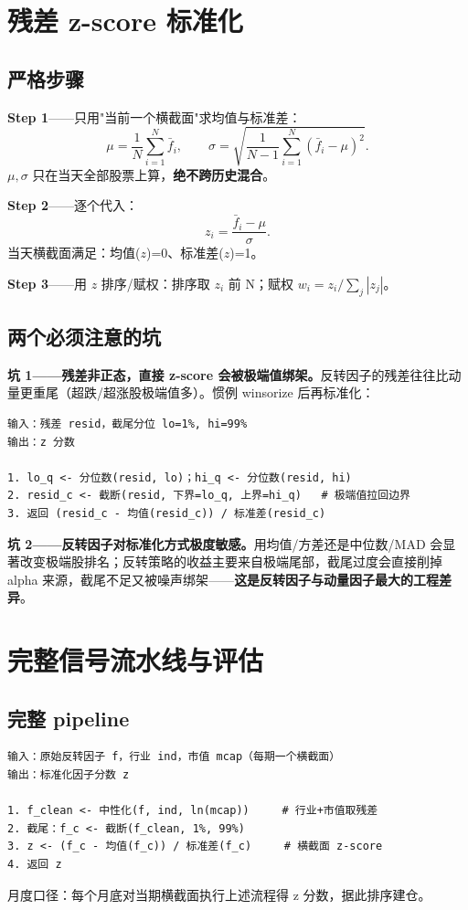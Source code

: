 \documentclass[UTF8,11pt]{ctexart}
\begin{document}
\section{残差 z-score 标准化}

\subsection{严格步骤}
\textbf{Step 1}——只用"当前一个横截面"求均值与标准差：
\begin{equation}
\mu=\frac1N\sum_{i=1}^{N}\bar f_i,\qquad
\sigma=\sqrt{\frac{1}{N-1}\sum_{i=1}^{N}(\bar f_i-\mu)^2}.
\end{equation}
$\mu,\sigma$ 只在当天全部股票上算，\textbf{绝不跨历史混合}。

\textbf{Step 2}——逐个代入：
\begin{equation}
z_i = \frac{\bar f_i-\mu}{\sigma}.
\end{equation}
当天横截面满足：均值($z$)=0、标准差($z$)=1。

\textbf{Step 3}——用 $z$ 排序/赋权：排序取 $z_i$ 前 N；赋权 $w_i=z_i/\sum_j|z_j|$。

\subsection{两个必须注意的坑}
\textbf{坑 1——残差非正态，直接 z-score 会被极端值绑架。}反转因子的残差往往比动量更重尾（超跌/超涨股极端值多）。惯例 winsorize 后再标准化：
\begin{lstlisting}[language={},caption={截尾 z-score（伪代码）}]
输入：残差 resid，截尾分位 lo=1%, hi=99%
输出：z 分数

1. lo_q <- 分位数(resid, lo)；hi_q <- 分位数(resid, hi)
2. resid_c <- 截断(resid, 下界=lo_q, 上界=hi_q)   # 极端值拉回边界
3. 返回 (resid_c - 均值(resid_c)) / 标准差(resid_c)
\end{lstlisting}

\textbf{坑 2——反转因子对标准化方式极度敏感。}用均值/方差还是中位数/MAD 会显著改变极端股排名；反转策略的收益主要来自极端尾部，截尾过度会直接削掉 alpha 来源，截尾不足又被噪声绑架——\textbf{这是反转因子与动量因子最大的工程差异}。

\section{完整信号流水线与评估}

\subsection{完整 pipeline}
\begin{lstlisting}[language={},caption={因子流水线（伪代码）}]
输入：原始反转因子 f，行业 ind，市值 mcap（每期一个横截面）
输出：标准化因子分数 z

1. f_clean <- 中性化(f, ind, ln(mcap))     # 行业+市值取残差
2. 截尾：f_c <- 截断(f_clean, 1%, 99%)
3. z <- (f_c - 均值(f_c)) / 标准差(f_c)     # 横截面 z-score
4. 返回 z
\end{lstlisting}
月度口径：每个月底对当期横截面执行上述流程得 z 分数，据此排序建仓。
\end{document}
